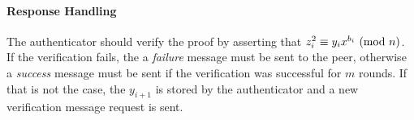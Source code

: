 \paragraph{Response Handling}
The authenticator should verify the proof by asserting that $z_i^2 \equiv y_ix^{b_i} \ (\mathrm{mod}\ n)$.
If the verification fails, the a \textit{failure} message must be sent to the peer, otherwise a \textit{success} message must be sent if the verification was successful for $m$ rounds.
If that is not the case, the $y_{i+1}$ is stored by the authenticator and a new verification message request is sent.
